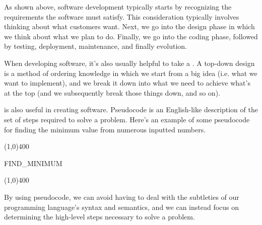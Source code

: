 As shown above, software development typically starts by recognizing the requirements the software must satisfy. This consideration typically involves thinking about what customers want. Next, we go into the design phase in which we think about what we plan to do. Finally, we go into the coding phase, followed by testing, deployment, maintenance, and finally evolution. 

When developing software, it's also usually helpful to take a . A top-down design is a method of ordering knowledge in which we start from a big idea (i.e. what we want to implement), and we break it down into what we need to achieve what's at the top (and we subsequently break those things down, and so on).


 is also useful in creating software. Pseudocode is an English-like description of the set of steps required to solve a problem. Here's an example of some pseudocode for finding the minimum value from numerous inputted numbers.


\begin{center}
\line(1,0){400}
\end{center}

\begin{allintypewriter}

FIND\_MINIMUM 

\begin{center}
\line(1,0){400}
\end{center}
\end{allintypewriter}

By using pseudocode, we can avoid having to deal with the subtleties of our programming language's syntax and semantics, and we can instead focus on determining the high-level steps necessary to solve a problem. 
